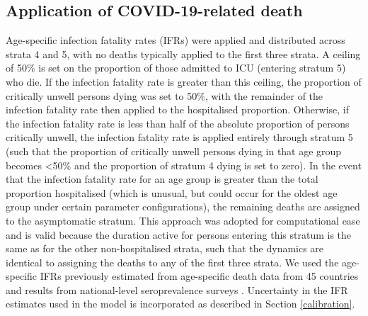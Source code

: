 \subsection{Application of COVID-19-related death}
Age-specific infection fatality rates (IFRs) were applied and distributed across strata 4 and 5, with no deaths typically applied to the first three strata. A ceiling of 50\% is set on the proportion of those admitted to ICU (entering stratum 5) who die. If the infection fatality rate is greater than this ceiling, the proportion of critically unwell persons dying was set to 50\%, with the remainder of the infection fatality rate then applied to the hospitalised proportion. Otherwise, if the infection fatality rate is less than half of the absolute proportion of persons critically unwell, the infection fatality rate is applied entirely through stratum 5 (such that the proportion of critically unwell persons dying in that age group becomes \textless 50\% and the proportion of stratum 4 dying is set to zero). In the event that the infection fatality rate for an age group is greater than the total proportion hospitalised (which is unusual, but could occur for the oldest age group under certain parameter configurations), the remaining deaths are assigned to the asymptomatic stratum. This approach was adopted for computational ease and is valid because the duration active for persons entering this stratum is the same as for the other non-hospitalised strata, such that the dynamics are identical to assigning the deaths to any of the first three strata. We used the age-specific IFRs previously estimated from age-specific death data from 45 countries and results from national-level seroprevalence surveys \cite{RN6}. Uncertainty in the IFR estimates used in the model is incorporated as described in Section \ref{calibration}.

